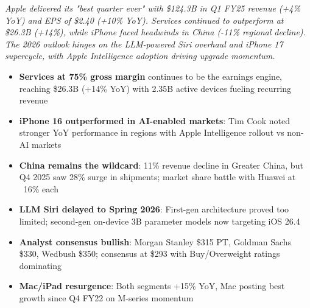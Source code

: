 \documentclass[11pt,a4paper]{article}
\begin{document}
\vspace{8pt}

\textit{Apple delivered its "best quarter ever" with \$124.3B in Q1 FY25 revenue (+4\% YoY) and EPS of \$2.40 (+10\% YoY). Services continued to outperform at \$26.3B (+14\%), while iPhone faced headwinds in China (-11\% regional decline). The 2026 outlook hinges on the LLM-powered Siri overhaul and iPhone 17 supercycle, with Apple Intelligence adoption driving upgrade momentum.}

\vspace{12pt}

\begin{tcolorbox}[colback=mslightgray, colframe=msblue, boxrule=1pt, arc=3pt, left=10pt, right=10pt, top=8pt, bottom=8pt, title={\textbf{Key Takeaways}}]
\begin{itemize}
    \item \textbf{Services at 75\% gross margin} continues to be the earnings engine, reaching \$26.3B (+14\% YoY) with 2.35B active devices fueling recurring revenue
    \item \textbf{iPhone 16 outperformed in AI-enabled markets}: Tim Cook noted stronger YoY performance in regions with Apple Intelligence rollout vs non-AI markets
    \item \textbf{China remains the wildcard}: 11\% revenue decline in Greater China, but Q4 2025 saw 28\% surge in shipments; market share battle with Huawei at ~16\% each
    \item \textbf{LLM Siri delayed to Spring 2026}: First-gen architecture proved too limited; second-gen on-device 3B parameter models now targeting iOS 26.4
    \item \textbf{Analyst consensus bullish}: Morgan Stanley \$315 PT, Goldman Sachs \$330, Wedbush \$350; consensus at \$293 with Buy/Overweight ratings dominating
    \item \textbf{Mac/iPad resurgence}: Both segments +15\% YoY, Mac posting best growth since Q4 FY22 on M-series momentum
\end{itemize}
\end{tcolorbox}

\vspace{10pt}

\end{document}
